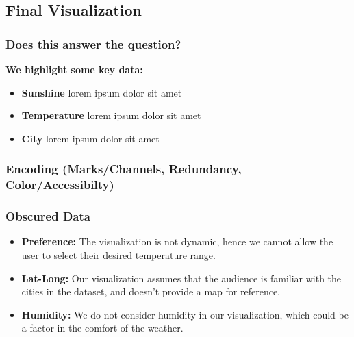 \documentclass{article}
\begin{document}
\subsection{Final Visualization}
\subsubsection{Does this answer the question?}

\textbf{We highlight some key data:}
\begin{itemize}
    \item \textbf{Sunshine} lorem ipsum dolor sit amet  
    \item \textbf{Temperature} lorem ipsum dolor sit amet
    \item \textbf{City} lorem ipsum dolor sit amet
\end{itemize}

\subsubsection{Encoding (Marks/Channels, Redundancy, Color/Accessibilty)}
\subsubsection{Obscured Data}
    \begin{itemize}
        \item \textbf{Preference:} The visualization is not dynamic, hence we cannot allow the user to select their desired temperature range.
        \item \textbf{Lat-Long:} Our visualization assumes that the audience is familiar with the cities in the dataset, and doesn't provide a map for reference.
        \item \textbf{Humidity:} We do not consider humidity in our visualization, which could be a factor in the comfort of the weather.
    \end{itemize}



\end{document}
